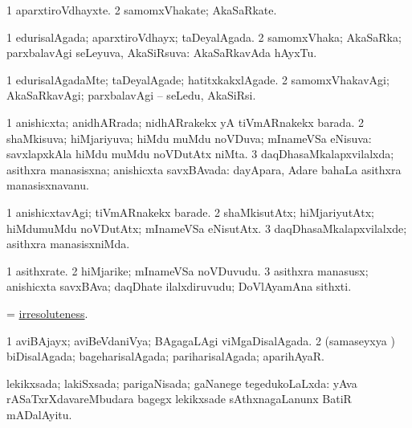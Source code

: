 \bentry
{}
\gl{\nA}
\bmng
\bnum
\num{1} aparxtiroVdhayxte. 
\num{2} samomxVhakate; AkaSaRkate. 
\enum
\emng
\eentry

\bentry
{}
\gl{\gu}
\bmng
\bnum
\num{1} edurisalAgada; aparxtiroVdhayx; taDeyalAgada. 
\num{2} samomxVhaka; AkaSaRka; parxbalavAgi seLeyuva, AkaSiRsuva:  AkaSaRkavAda hAyxTu. 
\enum
\emng
\eentry

\bentry
{}
\gl{\kirxvi}
\bmng
\bnum
\num{1} edurisalAgadaMte; taDeyalAgade; hatitxkakxlAgade. 
\num{2} samomxVhakavAgi; AkaSaRkavAgi; parxbalavAgi -- seLedu, AkaSiRsi. 
\enum
\emng
\eentry

\bentry
{}
\gl{\gu}
\bmng
\bnum
\num{1} anishicxta; anidhARrada; nidhARrakekx yA tiVmARnakekx barada. 
\num{2} shaMkisuva; hiMjariyuva; hiMdu muMdu noVDuva; mInameVSa eNisuva:  savxlapxkAla hiMdu muMdu noVDutAtx niMta. 
\num{3} daqDhasaMkalapxvilalxda; asithxra manasisxna; anishicxta savxBAvada:  dayApara, Adare bahaLa asithxra manasisxnavanu. 
\enum
\emng
\eentry

\bentry
{}
\gl{\kirxvi}
\bmng
\bnum
\num{1} anishicxtavAgi; tiVmARnakekx barade. 
\num{2} shaMkisutAtx; hiMjariyutAtx; hiMdumuMdu noVDutAtx; mInameVSa eNisutAtx. 
\num{3} daqDhasaMkalapxvilalxde; asithxra manasisxniMda. 
\enum
\emng
\eentry

\bentry
{}
\gl{\nA}
\bmng
\bnum
\num{1} asithxrate. 
\num{2} hiMjarike; mInameVSa noVDuvudu. 
\num{3} asithxra manasusx; anishicxta savxBAva; daqDhate ilalxdiruvudu; DoVlAyamAna sithxti. 
\enum
\emng
\eentry

\bentry
{}
\gl{\nA}
\bmng
=  \hyperlink{irresoluteness}{irresoluteness}. 
\emng
\eentry

\bentry
{}
\gl{\gu}
\bmng
\bnum
\num{1} aviBAjayx; aviBeVdaniVya; BAgagaLAgi viMgaDisalAgada. 
\num{2} (samaseyxya \vi) biDisalAgada; bageharisalAgada; pariharisalAgada; aparihAyaR. 
\enum
\emng
\eentry

\bentry
{}
\gl{\gu}
\bmng
lekikxsada; lakiSxsada; parigaNisada; gaNanege tegedukoLaLxda:  yAva rASaTxrXdavareMbudara bagegx lekikxsade sAthxnagaLanunx BatiR mADalAyitu. 
\emng
\eentry

